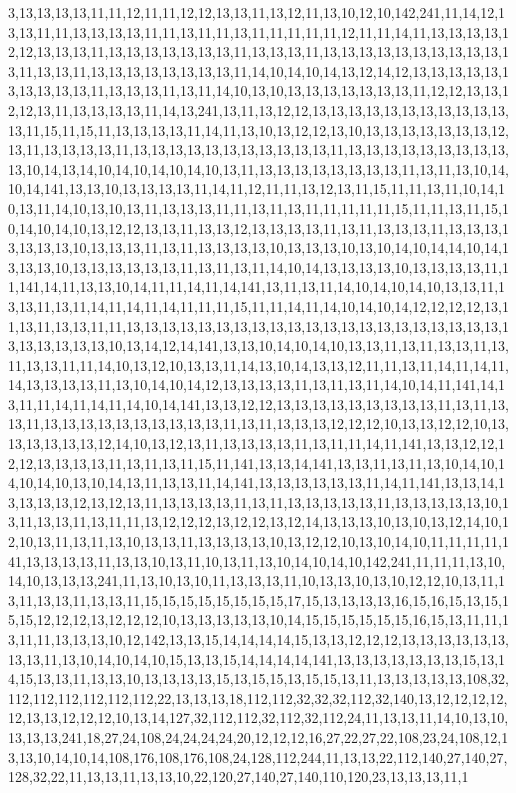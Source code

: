 3,13,13,13,13,11,11,12,11,11,12,12,13,13,11,13,12,11,13,10,12,10,142,241,11,14,12,13,13,11,11,13,13,13,13,11,11,13,11,11,13,11,11,11,11,11,12,11,11,14,11,13,13,13,13,12,12,13,13,13,11,13,13,13,13,13,13,13,11,13,13,13,11,13,13,13,13,13,13,13,13,13,13,13,11,13,13,11,13,13,13,13,13,13,13,13,11,14,10,14,10,14,13,12,14,12,13,13,13,13,13,13,13,13,13,13,11,13,13,13,11,13,11,14,10,13,10,13,13,13,13,13,13,13,11,12,12,13,13,12,12,13,11,13,13,13,13,11,14,13,241,13,11,13,12,12,13,13,13,13,13,13,13,13,13,13,13,13,11,15,11,15,11,13,13,13,13,11,14,11,13,10,13,12,12,13,10,13,13,13,13,13,13,13,12,13,11,13,13,13,13,11,13,13,13,13,13,13,13,13,13,13,13,11,13,13,13,13,13,13,13,13,13,13,10,14,13,14,10,14,10,14,10,14,10,13,11,13,13,13,13,13,13,13,13,11,13,11,13,10,14,10,14,141,13,13,10,13,13,13,13,11,14,11,12,11,11,13,12,13,11,15,11,11,13,11,10,14,10,13,11,14,10,13,10,13,11,13,13,13,11,11,13,11,13,11,11,11,11,11,15,11,11,13,11,15,10,14,10,14,10,13,12,12,13,13,11,13,13,12,13,13,13,13,11,13,11,13,13,13,11,13,13,13,13,13,13,13,10,13,13,13,11,13,11,13,13,13,13,10,13,13,13,10,13,10,14,10,14,14,10,14,13,13,13,10,13,13,13,13,13,13,11,13,11,13,11,14,10,14,13,13,13,13,10,13,13,13,13,11,11,141,14,11,13,13,10,14,11,11,14,11,14,141,13,11,13,11,14,10,14,10,14,10,13,13,11,13,13,11,13,11,14,11,14,11,14,11,11,11,15,11,11,14,11,14,10,14,10,14,12,12,12,12,13,11,13,11,13,13,11,11,13,13,13,13,13,13,13,13,13,13,13,13,13,13,13,13,13,13,13,13,13,13,13,13,13,13,13,10,13,14,12,14,141,13,13,10,14,10,14,10,13,13,11,13,11,13,13,11,13,11,13,13,11,11,14,10,13,12,10,13,13,11,14,13,10,14,13,13,12,11,11,13,11,14,11,14,11,14,13,13,13,13,11,13,10,14,10,14,12,13,13,13,13,11,13,11,13,11,14,10,14,11,141,14,13,11,11,14,11,14,11,14,10,14,141,13,13,12,12,13,13,13,13,13,13,13,13,13,11,13,11,13,13,11,13,13,13,13,13,13,13,13,13,13,11,13,11,13,13,13,12,12,12,10,13,13,12,12,10,13,13,13,13,13,13,12,14,10,13,12,13,11,13,13,13,13,11,13,11,11,14,11,141,13,13,12,12,12,12,13,13,13,13,11,13,11,13,11,15,11,141,13,13,14,141,13,13,11,13,11,13,10,14,10,14,10,14,10,13,10,14,13,11,13,13,11,14,141,13,13,13,13,13,13,11,14,11,141,13,13,14,13,13,13,13,12,13,12,13,11,13,13,13,13,11,13,11,13,13,13,13,13,11,13,13,13,13,13,10,13,11,13,13,11,13,11,11,13,12,12,12,13,12,12,13,12,14,13,13,13,10,13,10,13,12,14,10,12,10,13,11,13,11,13,10,13,13,11,13,13,13,13,10,13,12,12,10,13,10,14,10,11,11,11,11,141,13,13,13,13,11,13,13,10,13,11,10,13,11,13,10,14,10,14,10,142,241,11,11,11,13,10,14,10,13,13,13,241,11,13,10,13,10,11,13,13,13,11,10,13,13,10,13,10,12,12,10,13,11,13,11,13,13,11,13,13,11,15,15,15,15,15,15,15,15,17,15,13,13,13,13,16,15,16,15,13,15,15,15,12,12,12,13,12,12,12,10,13,13,13,13,13,10,14,15,15,15,15,15,15,16,15,13,11,11,13,11,11,13,13,13,10,12,142,13,13,15,14,14,14,14,15,13,13,12,12,12,13,13,13,13,13,13,13,13,11,13,10,14,10,14,10,15,13,13,15,14,14,14,14,141,13,13,13,13,13,13,13,15,13,14,15,13,13,11,13,13,10,13,13,13,13,15,13,15,15,13,15,15,13,11,13,13,13,13,13,108,32,112,112,112,112,112,112,22,13,13,13,18,112,112,32,32,32,112,32,140,13,12,12,12,12,12,13,13,12,12,12,10,13,14,127,32,112,112,32,112,32,112,24,11,13,13,11,14,10,13,10,13,13,13,241,18,27,24,108,24,24,24,24,20,12,12,12,16,27,22,27,22,108,23,24,108,12,13,13,10,14,10,14,108,176,108,176,108,24,128,112,244,11,13,13,22,112,140,27,140,27,128,32,22,11,13,13,11,13,13,10,22,120,27,140,27,140,110,120,23,13,13,13,11,1